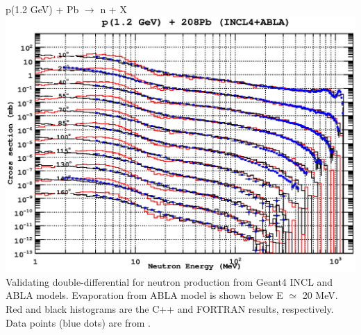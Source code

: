 \documentclass[20pt]{article}
\newenvironment{textbox}
{\begin{lrbox}{\dummybox}\begin{minipage}{0.9\columnwidth}}
{\end{minipage}\end{lrbox}\raisebox{-\depth}{\psshadowbox[framesep=1em,framearc=.1,shadow=true]{\usebox{\dummybox}}}\vspace{0.005\textheight}}
\begin{document}
\begin{center}
\begin{multicols}{3}









{\Huge {\sf p(1.2 GeV) + Pb $\rightarrow$ n + X}}
\includegraphics[scale=0.70]{images/pPbDD.eps}
{\Large {\sf Validating double-differential for neutron production
    from Geant4 INCL and ABLA models. Evaporation from ABLA model is
    shown below E $\simeq$ 20 MeV. Red and black histograms are the
    C++ and FORTRAN results, respectively. Data points (blue dots) are
    from \cite{data}.}}


\end{multicols}
\end{center}
\end{document}
